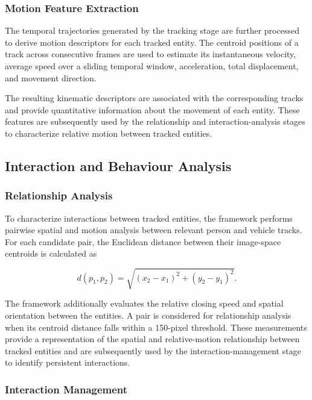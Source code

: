\documentclass[conference]{IEEEtran}
\begin{document}
\subsubsection{Motion Feature Extraction}

The temporal trajectories generated by the tracking stage are further
processed to derive motion descriptors for each tracked entity. The
centroid positions of a track across consecutive frames are used to
estimate its instantaneous velocity, average speed over a sliding temporal
window, acceleration, total displacement, and movement direction.

The resulting kinematic descriptors are associated with the corresponding
tracks and provide quantitative information about the movement of each
entity. These features are subsequently used by the relationship and
interaction-analysis stages to characterize relative motion between
tracked entities.

\subsection{Interaction and Behaviour Analysis}

\subsubsection{Relationship Analysis}

To characterize interactions between tracked entities, the framework
performs pairwise spatial and motion analysis between relevant person and
vehicle tracks. For each candidate pair, the Euclidean distance between
their image-space centroids is calculated as

\begin{equation}
d(p_1,p_2)=
\sqrt{(x_2-x_1)^2+(y_2-y_1)^2}.
\end{equation}

The framework additionally evaluates the relative closing speed and
spatial orientation between the entities. A pair is considered for
relationship analysis when its centroid distance falls within a
150-pixel threshold. These measurements provide a representation of the
spatial and relative-motion relationship between tracked entities and
are subsequently used by the interaction-management stage to identify
persistent interactions.

\subsubsection{Interaction Management}
\end{document}

